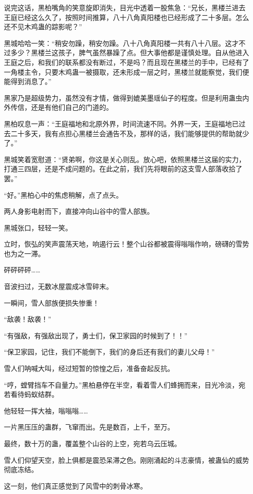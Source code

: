 \begin{this_body}
说完这话，黑柏嘴角的笑意旋即消失，目光中透着一股焦急：“兄长，黑楼兰进去王庭已经这么久了，按照时间推算，八十八角真阳楼也已经形成了二十多层。怎么还不见木鸡蛊的踪影呢？”

黑城哈哈一笑：“稍安勿躁，稍安勿躁。八十八角真阳楼一共有八十八层。这才不过多少？黑楼兰这孩子，脾气虽然暴躁了点。但大事他都是谨慎处理。自从他进入王庭之后，和我们的联系都没有断过，不是吗？而且现在黑楼兰的手中，已经有了一角楼主令，只要木鸡蛊一被摄取，还未形成一层之时，黑楼兰就能察觉，我们便能得到消息了。”

黑家乃是超级势力，虽然没有才情，做得到媲美墨瑶仙子的程度。但是利用蛊虫内外传信，还是有他们自己的门道的。

黑柏叹息一声：“王庭福地和北原外界，时间流速不同。外界一天，王庭福地已过去二十多天，我有点担心黑楼兰会通告不及，那样的话，我们能够提供的帮助就少了。”

黑城笑着宽慰道：“贤弟啊，你这是关心则乱。放心吧，依照黑楼兰这届的实力，打通三四层，还是不成问题的。在此之前，我们先将眼前的这支雪人部落收拾了罢。”

“好。”黑柏心中的焦虑稍解，点了点头。

两人身影电射而下，直接冲向山谷中的雪人部族。

黑城张口，轻轻一笑。

立时，恢弘的笑声震荡天地，响遏行云！整个山谷都被震得嗡嗡作响，磅礴的雪势也为之一滞。

砰砰砰砰……

音波扫过，无数冰屋震成冰雪碎末。

一瞬间，雪人部族便损失惨重！

“敌袭！敌袭！”

“有强敌，有强敌出现了，勇士们，保卫家园的时候到了！！”

“保卫家园，记住，我们不能倒下，我们的身后还有我们的妻儿父母！”

雪人们呐喊大叫，经过短暂的惊惶之后，准备奋起反抗。

“哼，螳臂挡车不自量力。”黑柏悬停在半空，看着雪人们蜂拥而来，目光冷淡，宛若看待蚂蚁结群。

他轻轻一挥大袖，嗡嗡嗡……

一片黑压压的蛊群，飞窜而出。先是数百，上千，至万。

最终，数十万的蛊，覆盖整个山谷的上空，宛若乌云压城。

雪人们仰望天空，脸上俱都是震恐呆滞之色。刚刚涌起的斗志豪情，被蛊仙的威势彻底冻结。

这一刻，他们真正感觉到了风雪中的刺骨冰寒。


\end{this_body}
